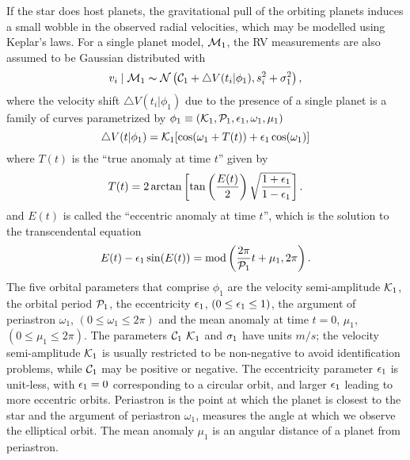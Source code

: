 If the star  does host planets, the gravitational pull of the orbiting
planets induces a small wobble in the observed radial velocities,
which may be modelled using Keplar's laws.
For a single planet model, $\M_1$, the RV measurements are also
assumed to be Gaussian distributed  with
\begin{equation}\label{Velocity_Model}
v_i \mid \M_1 \ind \N \left(\C_1 +\bigtriangleup
V(t_i|\phi_1),\s_i^2+\sj_1^2\right),
\end{equation}
where the velocity shift $\bigtriangleup
V(t_i|\phi_1)$ due to the presence of a single planet is
a  family of curves parametrized by 
$\phi_1 \equiv (\K_1,\P_1,\e_1,\omega_1,\mu_1)$
\begin{equation}\label{Velocity_1p_Model}
\bigtriangleup V(t|\phi_1)=\K_1[\cos(\omega_1+T(t))+\e_1 \cos(\omega_1)]
\end{equation}
where $T(t)$ is the ``true anomaly at time $t$'' given by
\begin{equation}\label{true_anomaly}
T(t)=2\arctan\left[\tan\left(\frac{E(t)}{2}\right)\sqrt{\frac{1+\e_1}{1-\e_1}}\right].
\end{equation}
and $E(t)$ is called the ``eccentric anomaly at time $t$'', which is the
solution to the transcendental equation
\begin{equation}\label{transcendental_equation}
E(t)-\e_1\sin(E(t))=\mbox{mod}\left(\frac{2\pi}{\P_1}t+\mu_1,2\pi\right).
\end{equation}
The five orbital parameters that comprise $\phi_1$ are the velocity
semi-amplitude $\K_1$, the orbital period $\P_1$, the eccentricity $\e_1$,
$(0\leq \e_1 \le 1)$, the argument of periastron $\omega_1$, $(0\le \omega_1
\le 2\pi)$ and the mean anomaly at time $t=0$, $\mu_1$, $(0\le \mu_1
\le 2\pi)$.  The parameters $\C_1$ $\K_1$ and $\sj_1$ have units $m/s$;
the velocity semi-amplitude $\K_1$ is usually restricted to be
non-negative to avoid identification problems, while $\C_1$ may be
positive or negative.  The eccentricity parameter $\e_1$ is unit-less,
with $\e_1 = 0$ corresponding to a circular orbit, and larger $\e_1$ leading
to more eccentric orbits. Periastron is the point at which the planet
is closest to the star and the argument of periastron $\omega_1$, measures
the angle at which we observe the elliptical orbit.  The mean anomaly $\mu_1$ is
an angular distance of a planet from periastron.  


